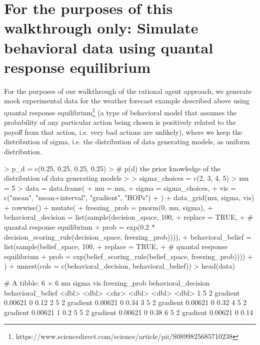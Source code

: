 \documentclass{article}
\begin{document}
\section{For the purposes of this walkthrough only: Simulate behavioral data using quantal response equilibrium}

For the purposes of our walkthrough of the rational agent approach, we generate mock experimental data for the weather forecast example described above using quantal response equilibrium\footnote{https://www.sciencedirect.com/science/article/pii/S0899825685710238} (a type of behavioral model that assumes the probability of any particular action being chosen is positively related to the payoff from that action, i.e. very bad actions are unlikely), where we keep the distribution of sigma, i.e. the distribution of data generating models, as uniform distribution.

\begin{Schunk}
\begin{Sinput}
> p_d = c(0.25, 0.25, 0.25, 0.25)
> # p(d) the prior knowledge of the distribution of data generating models
> 
> sigma_choices = c(2, 3, 4, 5)
> mu = 5
> data = data.frame(
+   mu = mu, 
+   sigma = sigma_choices,
+   vis = c("mean", "mean+interval", "gradient", "HOPs")
+ ) %>% 
+   data_grid(mu, sigma, vis) %>% 
+   rowwise() %>%
+   mutate(
+     freezing_prob = pnorm(0, mu, sigma),
+     behavioral_decision = list(sample(decision_space, 100, 
+       replace = TRUE, 
+       # quantal response equilibrium
+       prob = exp(0.2 * decision_scoring_rule(decision_space, freezing_prob)))),
+     behavioral_belief = list(sample(belief_space, 100, 
+       replace = TRUE, 
+       # quantal response equilibrium
+       prob = exp(belief_scoring_rule(belief_space, freezing_prob))))
+   ) %>%
+   unnest(cols = c(behavioral_decision, behavioral_belief))
> head(data)
\end{Sinput}
\begin{Soutput}
# A tibble: 6 × 6
     mu sigma vis      freezing_prob behavioral_decision behavioral_belief
  <dbl> <dbl> <chr>            <dbl>               <dbl>             <dbl>
1     5     2 gradient       0.00621                   0              0.12
2     5     2 gradient       0.00621                   0              0.34
3     5     2 gradient       0.00621                   0              0.32
4     5     2 gradient       0.00621                   1              0.2 
5     5     2 gradient       0.00621                   0              0.38
6     5     2 gradient       0.00621                   0              0.14
\end{Soutput}
\end{Schunk}
\end{document}
